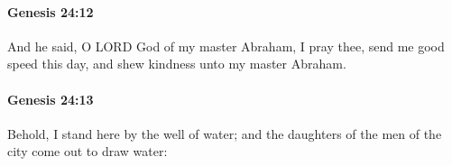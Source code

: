 		\paragraph{Genesis 24:12} %
			\label{GENESIS-24-12}

			And he said, O LORD God of my master Abraham, I pray thee, send me good speed this day, and shew kindness unto my master Abraham.


		\paragraph{Genesis 24:13} %
			\label{GENESIS-24-13}

			Behold, I stand here by the well of water; and the daughters of the men of the city come out to draw water:


